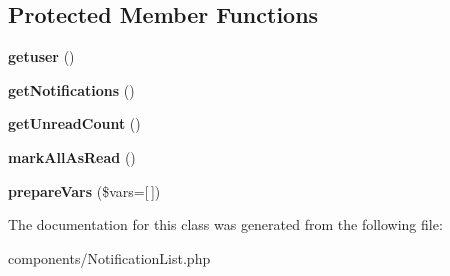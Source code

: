 \subsection*{Protected Member Functions}
\begin{DoxyCompactItemize}
\item 
\hypertarget{classDMA_1_1Friends_1_1Components_1_1NotificationList_a074dd7aca870f19ec427cd5a5d7ac251}{}{\bfseries getuser} ()\label{classDMA_1_1Friends_1_1Components_1_1NotificationList_a074dd7aca870f19ec427cd5a5d7ac251}

\item 
\hypertarget{classDMA_1_1Friends_1_1Components_1_1NotificationList_adc479f44c9f83683592e2b9bbfc8d814}{}{\bfseries get\+Notifications} ()\label{classDMA_1_1Friends_1_1Components_1_1NotificationList_adc479f44c9f83683592e2b9bbfc8d814}

\item 
\hypertarget{classDMA_1_1Friends_1_1Components_1_1NotificationList_adbda745fafdd386aec038c6f9e4d5147}{}{\bfseries get\+Unread\+Count} ()\label{classDMA_1_1Friends_1_1Components_1_1NotificationList_adbda745fafdd386aec038c6f9e4d5147}

\item 
\hypertarget{classDMA_1_1Friends_1_1Components_1_1NotificationList_a5eef82282d782ab43559e31143472542}{}{\bfseries mark\+All\+As\+Read} ()\label{classDMA_1_1Friends_1_1Components_1_1NotificationList_a5eef82282d782ab43559e31143472542}

\item 
\hypertarget{classDMA_1_1Friends_1_1Components_1_1NotificationList_a2e4271c838bd10f2790ae7ac1cb83638}{}{\bfseries prepare\+Vars} (\$vars=\mbox{[}$\,$\mbox{]})\label{classDMA_1_1Friends_1_1Components_1_1NotificationList_a2e4271c838bd10f2790ae7ac1cb83638}

\end{DoxyCompactItemize}


The documentation for this class was generated from the following file\+:\begin{DoxyCompactItemize}
\item 
components/Notification\+List.\+php\end{DoxyCompactItemize}
